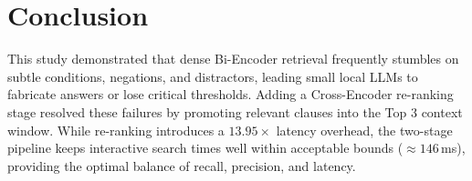 \documentclass[11pt,a4paper]{article}
\begin{document}
\section{Conclusion}
This study demonstrated that dense Bi-Encoder retrieval frequently stumbles on subtle conditions, negations, and distractors, leading small local LLMs to fabricate answers or lose critical thresholds. Adding a Cross-Encoder re-ranking stage resolved these failures by promoting relevant clauses into the Top 3 context window. While re-ranking introduces a $13.95\times$ latency overhead, the two-stage pipeline keeps interactive search times well within acceptable bounds ($\approx 146$\,ms), providing the optimal balance of recall, precision, and latency.
\end{document}
